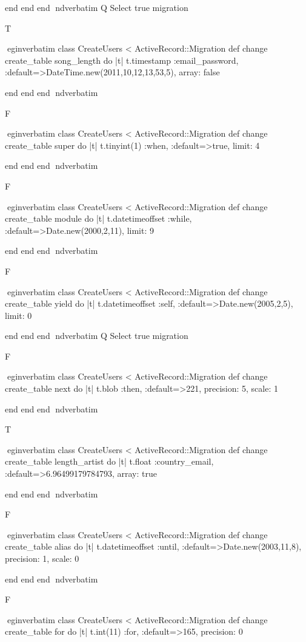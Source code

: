     end 
  end 
end
nd{verbatim}
Q
 Select true migration

T

egin{verbatim}
 class CreateUsers < ActiveRecord::Migration 
  def change 
    create_table song_length do |t| 
      t.timestamp :email_password, :default=>DateTime.new(2011,10,12,13,53,5), array: false
    
    end 
  end 
end
nd{verbatim}

F

egin{verbatim}
 class CreateUsers < ActiveRecord::Migration 
  def change 
    create_table super do |t| 
      t.tinyint(1) :when, :default=>true, limit: 4
    
    end 
  end 
end
nd{verbatim}

F

egin{verbatim}
 class CreateUsers < ActiveRecord::Migration 
  def change 
    create_table module do |t| 
      t.datetimeoffset :while, :default=>Date.new(2000,2,11), limit: 9
    
    end 
  end 
end
nd{verbatim}

F

egin{verbatim}
 class CreateUsers < ActiveRecord::Migration 
  def change 
    create_table yield do |t| 
      t.datetimeoffset :self, :default=>Date.new(2005,2,5), limit: 0
    
    end 
  end 
end
nd{verbatim}
Q
 Select true migration

F

egin{verbatim}
 class CreateUsers < ActiveRecord::Migration 
  def change 
    create_table next do |t| 
      t.blob :then, :default=>221, precision: 5, scale: 1
    
    end 
  end 
end
nd{verbatim}

T

egin{verbatim}
 class CreateUsers < ActiveRecord::Migration 
  def change 
    create_table length_artist do |t| 
      t.float :country_email, :default=>6.96499179784793, array: true
    
    end 
  end 
end
nd{verbatim}

F

egin{verbatim}
 class CreateUsers < ActiveRecord::Migration 
  def change 
    create_table alias do |t| 
      t.datetimeoffset :until, :default=>Date.new(2003,11,8), precision: 1, scale: 0
    
    end 
  end 
end
nd{verbatim}

F

egin{verbatim}
 class CreateUsers < ActiveRecord::Migration 
  def change 
    create_table for do |t| 
      t.int(11) :for, :default=>165, precision: 0
    
